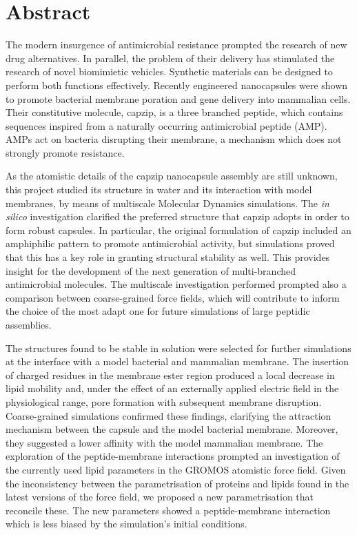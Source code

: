 \clearpage
\thispagestyle{empty}
\chapter*{Abstract}


\begin{onehalfspacing}

\noindent
%
The modern insurgence of antimicrobial resistance prompted the research of new drug alternatives. In parallel, the problem of their delivery has stimulated the research of novel biomimietic vehicles.
%
Synthetic materials can be designed to perform both functions effectively. Recently engineered nanocapsules were shown to promote bacterial membrane poration and gene delivery into mammalian cells. Their constitutive molecule, capzip, is a three branched peptide, which contains sequences inspired from a naturally occurring antimicrobial peptide (AMP). AMPs act on bacteria disrupting their membrane, a mechanism which does not strongly promote resistance.

As the atomistic details of the capzip nanocapsule assembly are still unknown, this project studied its structure in water and its interaction with model membranes, by means of multiscale Molecular Dynamics simulations. 
%
The \emph{in silico} investigation clarified the preferred structure that capzip adopts in order to form robust capsules.
In particular, the original formulation of capzip included an amphiphilic pattern to promote antimicrobial activity, but simulations proved that this has a key role in granting structural stability as well. This provides insight for the development of the next generation of multi-branched antimicrobial molecules.
%
The multiscale investigation performed prompted also a comparison between coarse-grained force fields, which will contribute to inform the choice of the most adapt one for future simulations of large peptidic assemblies.

The structures found to be stable in solution were selected for further simulations at the interface with a model bacterial and mammalian membrane.
%
The insertion of charged residues in the membrane ester region produced a local decrease in lipid mobility and, under the effect of an externally applied electric field in the physiological range, pore formation with subsequent membrane disruption.
%
Coarse-grained simulations confirmed these findings, clarifying the attraction mechanism between the capsule and the model bacterial membrane. Moreover, they suggested a lower affinity with the model mammalian membrane.
%
The exploration of the peptide-membrane interactions prompted an investigation of the currently used lipid parameters in the GROMOS atomistic force field. Given the inconsistency between the parametrisation of proteins and lipids found in the latest versions of the force field, we proposed a new parametrisation that reconcile these. The new parameters showed a peptide-membrane interaction which is less biased by the simulation's initial conditions.


\end{onehalfspacing}
